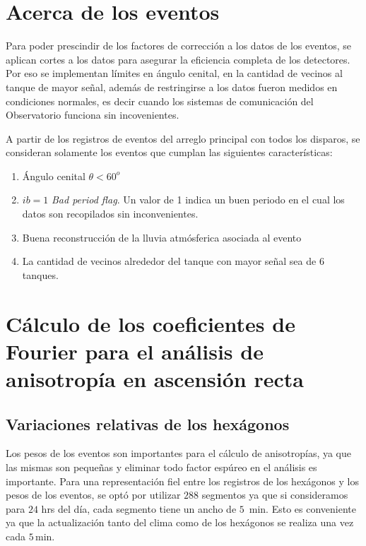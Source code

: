\section{Acerca de los eventos} \label{filtro}

Para poder prescindir de los factores de corrección a los datos de los eventos, se aplican cortes a los datos para asegurar la eficiencia completa de los detectores. Por eso se implementan  límites en ángulo cenital, en la cantidad de vecinos al tanque de mayor señal, además de restringirse a los datos fueron medidos en condiciones normales, es decir cuando los sistemas de comunicación del Observatorio funciona sin incovenientes.


A partir de los registros de eventos del arreglo principal con todos los disparos, se consideran solamente los eventos que cumplan las siguientes características:

    \begin{enumerate}
      \item Ángulo cenital $\theta < 60^o$
      \item $ib=1$ \emph{Bad period flag}. Un valor de 1 indica un buen periodo en el cual los datos son recopilados sin inconvenientes.
      \item Buena reconstrucción de la lluvia atmósferica asociada al evento
      \item La cantidad de vecinos alrededor del tanque con mayor señal sea de 6 tanques.
    \end{enumerate}
   
\section{Cálculo de los coeficientes de Fourier para el análisis de anisotropía en ascensión recta}

  \subsection{Variaciones relativas de los hexágonos} \label{peso_hexagonos}

    Los pesos de los eventos son importantes para el cálculo de anisotropías, ya que las mismas son pequeñas y eliminar todo factor espúreo en el análisis es importante. Para una representación fiel entre los registros de los hexágonos y los pesos de los eventos, se optó por utilizar $288$ segmentos ya que si consideramos para $24$ hrs del día, cada segmento tiene un ancho de $5$\, min. Esto es conveniente ya que la actualización tanto del clima como de los hexágonos se realiza una vez cada $5$\,min.

